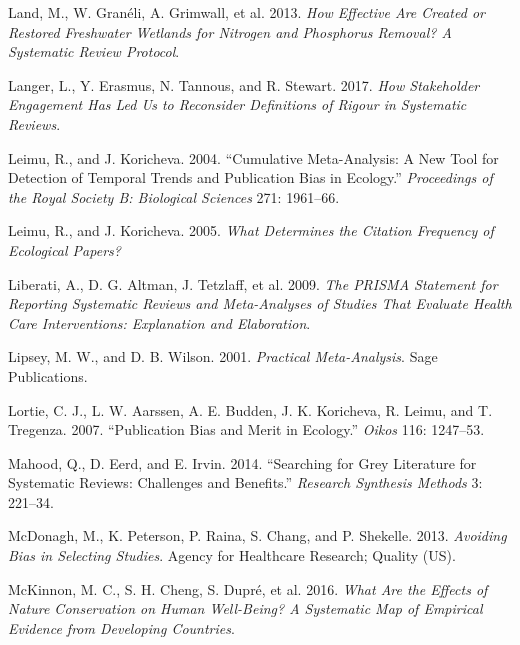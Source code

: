 \documentclass[
  letterpaper,
  DIV=11,
  numbers=noendperiod]{scrreprt}
\newlength{\cslhangindent}
\newenvironment{CSLReferences}[2] %
 {\begin{list}{}{%
  \setlength{\itemindent}{0pt}
  \setlength{\leftmargin}{0pt}
  \setlength{\parsep}{0pt}
  \ifodd #1
   \setlength{\leftmargin}{\cslhangindent}
   \setlength{\itemindent}{-1\cslhangindent}
  \fi
  \setlength{\itemsep}{#2\baselineskip}}}
 {\end{list}}
\begin{document}
\begin{CSLReferences}{1}{1}
Land, M., W. Granéli, A. Grimwall, et al. 2013. \emph{How Effective Are
Created or Restored Freshwater Wetlands for Nitrogen and Phosphorus
Removal? A Systematic Review Protocol}.

Langer, L., Y. Erasmus, N. Tannous, and R. Stewart. 2017. \emph{How
Stakeholder Engagement Has Led Us to Reconsider Definitions of Rigour in
Systematic Reviews}.

Leimu, R., and J. Koricheva. 2004. {``Cumulative Meta-Analysis: A New
Tool for Detection of Temporal Trends and Publication Bias in
Ecology.''} \emph{Proceedings of the Royal Society B: Biological
Sciences} 271: 1961--66.

Leimu, R., and J. Koricheva. 2005. \emph{What Determines the Citation
Frequency of Ecological Papers?}

Liberati, A., D. G. Altman, J. Tetzlaff, et al. 2009. \emph{The PRISMA
Statement for Reporting Systematic Reviews and Meta-Analyses of Studies
That Evaluate Health Care Interventions: Explanation and Elaboration}.

Lipsey, M. W., and D. B. Wilson. 2001. \emph{Practical Meta-Analysis}.
Sage Publications.

Lortie, C. J., L. W. Aarssen, A. E. Budden, J. K. Koricheva, R. Leimu,
and T. Tregenza. 2007. {``Publication Bias and Merit in Ecology.''}
\emph{Oikos} 116: 1247--53.

Mahood, Q., D. Eerd, and E. Irvin. 2014. {``Searching for Grey
Literature for Systematic Reviews: Challenges and Benefits.''}
\emph{Research Synthesis Methods} 3: 221--34.

McDonagh, M., K. Peterson, P. Raina, S. Chang, and P. Shekelle. 2013.
\emph{Avoiding Bias in Selecting Studies}. Agency for Healthcare
Research; Quality (US).

McKinnon, M. C., S. H. Cheng, S. Dupré, et al. 2016. \emph{What Are the
Effects of Nature Conservation on Human Well-Being? A Systematic Map of
Empirical Evidence from Developing Countries}.


\end{CSLReferences}
\end{document}
